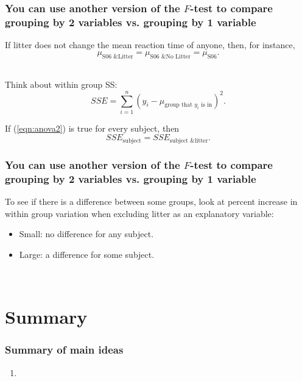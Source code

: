 \documentclass[slidestop,compress,mathserif,12pt,t,professionalfonts,xcolor=table]{beamer}
\newcommand{\ftest}{You can use another version of the $F$-test to compare grouping by 2 variables vs. grouping by 1 variable}
\begin{document}
\begin{frame}
  \frametitle{\ftest}

If litter does not change the mean reaction time of anyone, then, for instance,
\begin{equation}
\label{eqn:anova2}
\mu_{\text{S06 \& Litter}} = \mu_{\text{S06 \& No Litter}} = \mu_{\text{S06}}.
\end{equation}

\pause

\hfill \\

Think about within group SS:
\[
SSE = \sum_{i=1}^n (y_i - \mu_{\text{group that $y_i$ is in}})^2.
\]

\pause

If (\ref{eqn:anova2}) is true for every subject, then
\[
SSE_{\text{subject}} = SSE_{\text{subject \& litter}}.
\]

\end{frame}


\begin{frame}
  \frametitle{\ftest}

To see if there is a difference between some groups, look at percent increase in within group variation when excluding litter as an explanatory variable:

\begin{itemize}
\item Small: no difference for any subject.
\item Large: a difference for some subject.
\end{itemize}

\hfill \\


\end{frame}


\section{Summary}


\begin{frame}
\frametitle{Summary of main ideas}

\vfill

\begin{enumerate}

\item {}

\end{enumerate}

\vfill

\end{frame}

\end{document}

